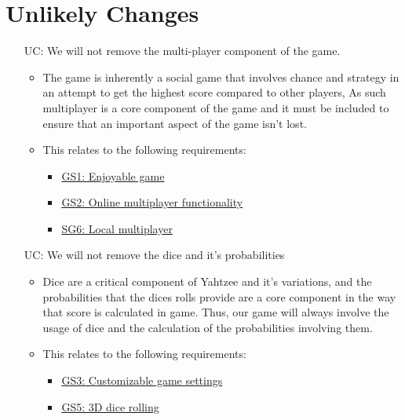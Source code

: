 \begin{itemize}
    


\end{itemize}


\section{Unlikely Changes}    

\noindent \begin{itemize}

\item[UC\refstepcounter{ucnum}\theucnum \label{ULC_multiplayer}:] We will not remove the multi-player component of the game.

\begin{itemize}
	\item The game is inherently a social game that involves chance and strategy in an attempt to get the highest score compared to other players, As such multiplayer is a core component of the game and it must be included to ensure that an important aspect of the game isn't lost.
	\item This relates to the following requirements: 
	\begin{itemize}
		\item \hyperref[G_enjoyable]{GS1: Enjoyable game}
		\item \hyperref[G_multiplayer]{GS2: Online multiplayer functionality}
		\item \hyperref[G_local_multiplayer]{SG6: Local multiplayer}
	\end{itemize}
\end{itemize}

	
\item[UC\refstepcounter{ucnum}\theucnum \label{ULC_dice}:] We will not remove the dice and it's probabilities 

\begin{itemize}
	\item Dice are a critical component of Yahtzee and it's variations, and the probabilities that the dices rolls provide are a core component in the way that score is calculated in game. Thus, our game will always involve the usage of dice and the calculation of the probabilities involving them.
	\item This relates to the following requirements: 
	\begin{itemize}
		\item \hyperref[G_customization]{GS3: Customizable game settings}
		\item \hyperref[G_3D]{GS5: 3D dice rolling}
	\end{itemize}
\end{itemize}



\end{itemize}
